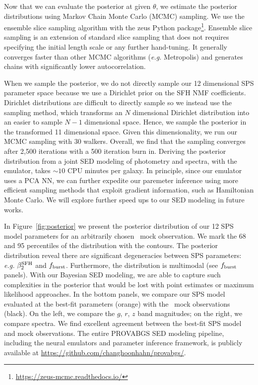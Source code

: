 Now that we can evaluate the posterior at given $\theta$, we estimate the
posterior distributions using Markov Chain Monte Carlo (MCMC) sampling. 
We use the \cite{karamanis2020} ensemble slice sampling algorithm with the
{\sc zeus} Python
package\footnote{\href{https://zeus-mcmc.readthedocs.io/}{https://zeus-mcmc.readthedocs.io/}}. 
Ensemble slice sampling is an extension of standard slice sampling that does
not requires specifying the initial length scale or any further hand-tuning.
It generally converges faster than other MCMC algorithms (\emph{e.g.}
Metropolis) and generates chains with significantly lower autocorrelation.

When we sample the posterior, we do not directly sample our 12 dimensional
SPS parameter space because we use a Dirichlet prior on the SFH NMF
coefficients. 
Dirichlet distributions are difficult to directly sample so we instead use the
\cite{betancourt2012} sampling method, which transforms an $N$ dimensional
Dirichlet distribution into an easier to sample $N-1$ dimensional space.
Hence, we sample the posterior in the transformed 11 dimensional space. 
Given this dimensionality, we run our MCMC sampling with 30 walkers.
Overall, we find that the sampling converges after 2,500 iterations with a 500
iteration burn in. 
Deriving the posterior distribution from a joint SED modeling of photometry and
spectra, with the emulator, takes ${\sim}10$ CPU minutes per galaxy.
In principle, since our emulator uses a PCA NN, we can further expedite our
paremeter inference using more efficient sampling methods that exploit gradient
information, such as Hamiltonian Monte Carlo.  
We will explore further speed ups to our SED modeling in future works. 

In Figure~\ref{fig:posterior} we present the posterior distribution of our 12
SPS model parameters for an arbitrarily chosen \lgal~mock observation. 
We mark the 68 and 95 percentiles of the distribution with the contours. 
The posterior distribution reveal there are significant degeneracies between
SPS parameters: \emph{e.g.} $\beta_2^{\rm SFH}$ and $f_{\rm burst}$. 
Furthermore, the distribution is multimodal (see $f_{\rm burst}$ panels). 
With our Bayesian SED modeling, we are able to capture such complexities in the
posterior that would be lost with point estimates or maximum likelihood
approaches.
In the bottom panels, we compare our SPS model evaluated at the best-fit
parameters (orange) with the \lgal~mock observations (black). 
On the left, we compare the $g$, $r$, $z$ band magnitudes; on the right, we
compare spectra. 
We find excellent agreement between the best-fit SPS model and mock
observations.
The entire PROVABGS SED modeling pipeline, including the neural emulators and
parameter inference framework, is publicly available at
\href{https://github.com/changhoonhahn/provabgs/}{https://github.com/changhoonhahn/provabgs/}. 
